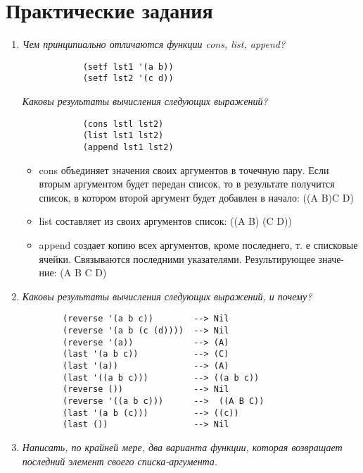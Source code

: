 \chapter{Практические задания}

\begin{enumerate}[wide=0pt]

	\item \textit{Чем принципиально отличаются функции cons, list, append?}

		\begin{lstlisting}
			(setf lst1 '(a b))
			(setf lst2 '(c d))
		\end{lstlisting}

		\textit{Каковы результаты вычисления следующих выражений?}
		\begin{lstlisting}
			(cons lstl lst2)
			(list lst1 lst2)
			(append lst1 lst2)
		\end{lstlisting}

		\begin{itemize}
			\item cons объединяет значения своих аргументов в точечную пару. Если вторым
			аргументом будет передан список, то в результате получится список, в
			котором второй аргумент будет добавлен в начало: ((A B)C D)

			\item list составляет из своих аргументов список: ((A B) (C D))
			\item append создает копию всех аргументов, кроме последнего, т. е списковые
			ячейки. Связываются последними указателями. Результирующее значе-
			ние: (A B C D)
		\end{itemize}


	\item  \textit{Каковы результаты вычисления следующих выражений, и почему?}

	\begin{lstlisting}
		(reverse '(a b c))        --> Nil
		(reverse '(a b (c (d))))  --> Nil
		(reverse '(a))            --> (A)
		(last '(a b c))           --> (C) 
		(last '(a))               --> (A)
		(last '((a b c)))         --> ((a b c))
		(reverse ())              --> Nil
		(reverse '((a b c)))      -->  ((A B C))
		(last '(a b (c)))         --> ((c))
		(last ())                 --> Nil
	\end{lstlisting}

	\item  \textit{Написать, по крайней мере, два варианта функции, 
	которая возвращает
	последний элемент своего списка-аргумента.}


\end{enumerate}
